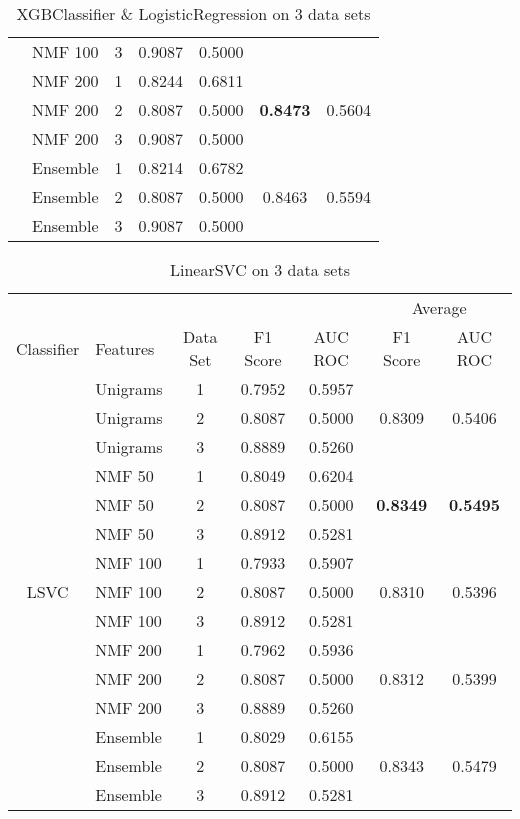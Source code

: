 \documentclass[12pt, twoside]{article}
\begin{document}
\begin{table}[!htbp]
\begin{tabular}{clccccc}
  	&	NMF 100	&	3	&	0.9087	&	0.5000	&		&	 \\
  	\cmidrule(r){2-7}
  	&	NMF 200	&	1	&	0.8244	&	0.6811	&		&	 \\
  	&	NMF 200	&	2	&	0.8087	&	0.5000	&	\textbf{0.8473}	&	0.5604 \\
  	&	NMF 200	&	3	&	0.9087	&	0.5000	&		&	 \\
  	\cmidrule(r){2-7}
  	&	Ensemble	&	1	&	0.8214	&	0.6782	&		&	 \\
  	&	Ensemble	&	2	&	0.8087	&	0.5000	&	0.8463	&	0.5594 \\
  	&	Ensemble	&	3	&	0.9087	&	0.5000	&		&	 \\
  \bottomrule
  \end{tabular}
  \caption{XGBClassifier \& LogisticRegression on 3 data sets}
\end{table}

\newpage

\begin{table}[!htbp]
  \centering
  \begin{tabular}{clccccc}
  \toprule
  {} & {} &	{}	& {}	&	{} & \multicolumn{2}{c}{Average} \\
  \cmidrule(r){6-7}
  Classifier	&	Features	&	Data Set	&	F1 Score	&	AUC ROC	&	F1 Score	&	AUC ROC \\
  \midrule
  	&	Unigrams	&	1	&	0.7952	&	0.5957	&		&	 \\
  	&	Unigrams	&	2	&	0.8087	&	0.5000	&	0.8309	&	0.5406 \\
  	&	Unigrams	&	3	&	0.8889	&	0.5260	&		&	 \\
  	\cmidrule(r){2-7}
  	&	NMF 50	&	1	&	0.8049	&	0.6204	&		&	 \\
  	&	NMF 50	&	2	&	0.8087	&	0.5000	&	\textbf{0.8349}	&	\textbf{0.5495} \\
  	&	NMF 50	&	3	&	0.8912	&	0.5281	&		&	 \\
  	\cmidrule(r){2-7}
  	&	NMF 100	&	1	&	0.7933	&	0.5907	&		&	 \\
  LSVC	&	NMF 100	&	2	&	0.8087	&	0.5000	&	0.8310	&	0.5396 \\
  	&	NMF 100	&	3	&	0.8912	&	0.5281	&		&	 \\
  	\cmidrule(r){2-7}
  	&	NMF 200	&	1	&	0.7962	&	0.5936	&		&	 \\
  	&	NMF 200	&	2	&	0.8087	&	0.5000	&	0.8312	&	0.5399 \\
  	&	NMF 200	&	3	&	0.8889	&	0.5260	&		&	 \\
  	\cmidrule(r){2-7}
  	&	Ensemble	&	1	&	0.8029	&	0.6155	&		&	 \\
  	&	Ensemble	&	2	&	0.8087	&	0.5000	&	0.8343	&	0.5479 \\
  	&	Ensemble	&	3	&	0.8912	&	0.5281	&		&	 \\
  \bottomrule
  \end{tabular}
  \caption{LinearSVC on 3 data sets}
\end{table}
\end{document}
